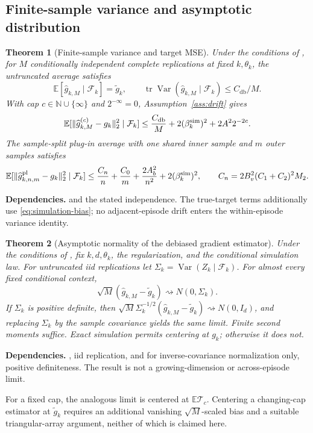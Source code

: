 \documentclass[11pt]{article}
\newtheorem{theorem}{Theorem}[section]
\newcommand{\E}{\mathbb E}
\newcommand{\N}{\mathbb N}
\newcommand{\Var}{\operatorname{Var}}
\newcommand{\1}{\mathbf 1}
\newcommand{\tr}{\operatorname{tr}}
\DeclarePairedDelimiter{\norm}{\lVert}{\rVert}
\newcommand{\cF}{\mathcal F}
\newcommand{\db}{\mathrm{db}}
\newcommand{\pl}{\mathrm{pl}}
\theoremstyle{definition}
\newcommand{\dependson}[1]{\par\noindent\textbf{Dependencies.} #1\par\smallskip}
\begin{document}
\subsection{Finite-sample variance and asymptotic distribution}
\begin{theorem}[Finite-sample variance and target MSE]\label{thm:variance}
Under the conditions of , for $M$ conditionally independent complete replications at fixed $k,\theta_k$, the untruncated average satisfies
\begin{equation}\label{eq:variance-bound}
 \E[\widehat g_{k,M}\mid\cF_k]=\widetilde g_k,
 \qquad \tr\Var(\widehat g_{k,M}\mid\cF_k)\le C_{\db}/M.
\end{equation}
With cap $c\in\N\cup\{\infty\}$ and $2^{-\infty}=0$, Assumption~\ref{ass:drift} gives
\begin{equation}\label{eq:total-mse}
 \E[\norm{\widehat g_{k,M}^{(c)}-g_k}_2^2\mid\cF_k]
 \le \frac{C_{\db}}M+2(\beta_k^{\rm sim})^2+2A^22^{-2c}.
\end{equation}
The sample-split plug-in average with one shared inner sample and $m$ outer samples satisfies
\begin{equation}\label{eq:plugin-mse}
 \E[\norm{\widehat g_{k,n,m}^{\pl}-g_k}_2^2\mid\cF_k]
 \le\frac{C_n}{n}+\frac{C_0}{m}+\frac{2A_b^2}{n^2}
 +2(\beta_k^{\rm sim})^2,
 \qquad C_n=2B_v^2(C_1+C_2)^2M_2.
\end{equation}
\end{theorem}
\dependson{ and the stated independence. The true-target terms additionally use \eqref{eq:simulation-bias}; no adjacent-episode drift enters the within-episode variance identity.}

\begin{theorem}[Asymptotic normality of the debiased gradient estimator]\label{thm:clt}
Under the conditions of , fix $k,d,\theta_k$, the regularization, and the conditional simulation law. For untruncated iid replications let $\Sigma_k=\Var(Z_k\mid\cF_k)$. For almost every fixed conditional context,
\begin{equation}\label{eq:clt}
 \sqrt M(\widehat g_{k,M}-\widetilde g_k)
 \rightsquigarrow N(0,\Sigma_k).
\end{equation}
If $\Sigma_k$ is positive definite, then
$\sqrt M\Sigma_k^{-1/2}(\widehat g_{k,M}-\widetilde g_k)\rightsquigarrow N(0,I_d)$,
and replacing $\Sigma_k$ by the sample covariance yields the same limit. Finite second moments suffice. Exact simulation permits centering at $g_k$; otherwise it does not.
\end{theorem}
\dependson{, iid replication, and for inverse-covariance normalization only, positive definiteness. The result is not a growing-dimension or across-episode limit.}
For a fixed cap, the analogous limit is centered at $\E \mathcal T_c$. Centering a changing-cap estimator at $\widetilde g_k$ requires an additional vanishing $\sqrt M$-scaled bias and a suitable triangular-array argument, neither of which is claimed here.
\end{document}
